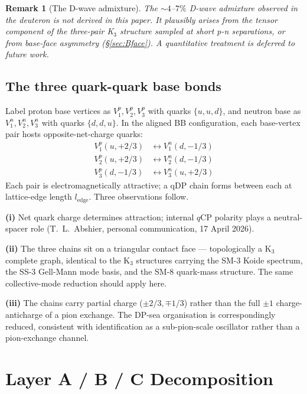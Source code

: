 \documentclass[11pt,letterpaper]{article}
\newtheorem{remark}[theorem]{Remark}
\newcommand{\ledge}{l_{\mathrm{edge}}}
\newcommand{\qCP}{q\mathrm{CP}}
\begin{document}
\begin{remark}[The D-wave admixture]
The $\sim 4$--$7\%$ D-wave admixture observed in the deuteron is not derived in this paper. It plausibly arises from the tensor component of the three-pair K$_3$ structure sampled at short p-n separations, or from base-face asymmetry (§\ref{sec:Bface}). A quantitative treatment is deferred to future work.
\end{remark}

\subsection{The three quark-quark base bonds}

Label proton base vertices as $V^p_1, V^p_2, V^p_3$ with quarks $\{u, u, d\}$, and neutron base as $V^n_1, V^n_2, V^n_3$ with quarks $\{d, d, u\}$. In the aligned BB configuration, each base-vertex pair hosts opposite-net-charge quarks:
\begin{align*}
V^p_1 (u, +2/3) &\leftrightarrow V^n_1 (d, -1/3) \\
V^p_2 (u, +2/3) &\leftrightarrow V^n_2 (d, -1/3) \\
V^p_3 (d, -1/3) &\leftrightarrow V^n_3 (u, +2/3)
\end{align*}
Each pair is electromagnetically attractive; a qDP chain forms between each at lattice-edge length $\ledge$. Three observations follow.

\textbf{(i)} Net quark charge determines attraction; internal $\qCP$ polarity plays a neutral-spacer role (T.~L.~Abshier, personal communication, 17 April 2026).

\textbf{(ii)} The three chains sit on a triangular contact face --- topologically a K$_3$ complete graph, identical to the K$_3$ structures carrying the SM-3 Koide spectrum, the SS-3 Gell-Mann mode basis, and the SM-8 quark-mass structure. The same collective-mode reduction should apply here.

\textbf{(iii)} The chains carry partial charge ($\pm 2/3, \mp 1/3$) rather than the full $\pm 1$ charge-anticharge of a pion exchange. The DP-sea organisation is correspondingly reduced, consistent with identification as a sub-pion-scale oscillator rather than a pion-exchange channel.

\section{Layer A / B / C Decomposition}
\label{sec:layers}
\end{document}
